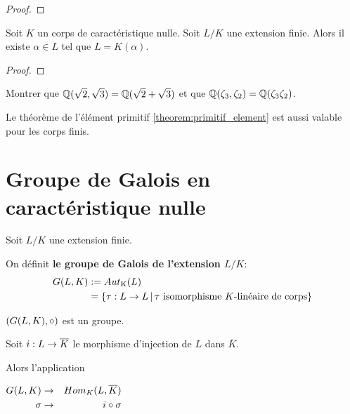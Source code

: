 \ifdefined\outputproof
\begin{proof}

\end{proof}
\fi



\begin{theorem} 
	\label{theorem:primitif_element}
	Soit $K$ un corps de caractéristique nulle.
	Soit $L/K$ une extension finie. Alors il existe $\alpha \in L$ tel que $L =
	K(\alpha)$.
\end{theorem}

\ifdefined\outputproof
\begin{proof}

\end{proof}
\fi

\begin{exercice}
	Montrer que $\mathbb{Q}(\sqrt{2}, \sqrt{3}) = \mathbb{Q}(\sqrt{2} + \sqrt{3})$
	et que $\mathbb{Q}(\zeta_{3}, \zeta_{2}) = \mathbb{Q}(\zeta_{3} \zeta_{2})$.
\end{exercice}

\begin{remarque}
	Le théorème de l'élément primitif \ref{theorem:primitif_element} est aussi
	valable pour les corps finis.
\end{remarque}

\section{Groupe de Galois en caractéristique nulle}

\begin{definition} 
	Soit $L/K$ une extension finie.

	On définit \textbf{le groupe de Galois de l'extension $L/K$}:
	\begin{align*}
		G(L, K) & := Aut_{\text{K}}(L) \\
		& = \left\{\tau : L \rightarrow L \, | \, \text{$\tau$ isomorphisme
		$K$-linéaire de corps} \right\}
	\end{align*}

	$(G(L, K), \circ)$ est un groupe.
\end{definition}

Soit $i : L \rightarrow \overline{K}$ le morphisme d'injection de $L$ dans
$\overline{K}$.

Alors l'application

\begin{center}
$
\begin{aligned}
	G(L, K) &\rightarrow& Hom_{K}(L, \overline{K}) \\
	\sigma &\rightarrow& i \circ \sigma
\end{aligned}
$
\end{center}

